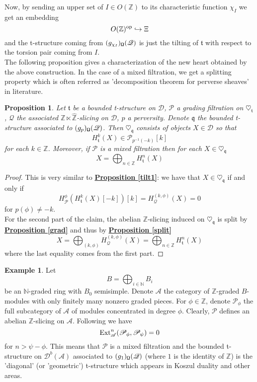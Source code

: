 \documentclass{article}
\newtheorem{prop}[thm]{Proposition}
\theoremstyle{definition}
\newtheorem{exmp}[thm]{Example}
\begin{document}
Now, by sending an upper set of $I \in O(\mathbb{Z})$ to its characteristic function $\chi_I$ we get an embedding $$O(\mathbb{Z})^{\textnormal{op}} \hookrightarrow \Xi$$ and the t-structure coming from $(g_{\chi_I})_{\textnormal{\Libra}}(\mathscr{Q})$ is just the tilting of $\mathfrak{t}$ with respect to the torsion pair coming from $I$. \\
The following proposition gives a characterization of the new heart obtained by the above construction. In the case of a mixed filtration, we get a splitting property which is often referred as 'decomposition theorem for perverse sheaves' in literature. \\

\begin{prop}
Let $\mathfrak{t}$ be a bounded t-structure on $\mathscr{D}$, $\mathscr{P}$ a grading filtration on $\heartsuit_{\mathfrak{t}}$, $\mathscr{Q}$ the associated $\mathbb{Z} \ltimes \hat{\mathbb{Z}}$-slicing on $\mathscr{D}$, $p$ a perversity. Denote $\mathfrak{q}$ the bounded t-structure associated to $(g_p)_{\textnormal{\Libra}}(\mathscr{Q})$. Then $\heartsuit_{\mathfrak{q}}$ consists of objects $X \in \mathscr{D}$ so that $$H_{\mathfrak{t}}^{k}(X) \in \mathscr{P}_{p^{-1}(-k)}[k]$$ 
for each $k \in \mathbb{Z}$. Moreover, if $\mathscr{P}$ is a mixed filtration then for each $X \in \heartsuit_{\mathfrak{q}}$ $$X=\bigoplus_{n \in \mathbb{Z}}H_{\mathfrak{t}}^{n}(X)$$ 
\end{prop}

\begin{proof}
This is very similar to \hyperref[tilt1]{\textbf{Proposition \ref*{tilt1}}}: we have that $X \in \heartsuit_{\mathfrak{q}}$ if and only if $$H_{\mathscr{P}}^{\phi}(H_{\mathfrak{t}}^k(X)[-k])[k]=H_{\mathscr{Q}}^{(k,\phi)}(X)=0$$ 
for $p(\phi) \not = -k$. \\
For the second part of the claim, the abelian $\mathbb{Z}$-slicing induced on $\heartsuit_{\mathfrak{q}}$ is split by \hyperref[grad]{\textbf{Proposition \ref*{grad}}} and thus by \hyperref[split]{\textbf{Proposition \ref*{split}}} $$X=\bigoplus_{(k,\phi)}H_{\mathscr{Q}}^{(k,\phi)}(X)=\bigoplus_{n \in \mathbb{Z}}H_{\mathfrak{t}}^{n}(X)$$
where the last equality comes from the first part. 
\end{proof}

\begin{exmp}
Let $$B=\bigoplus_{i\in \mathbb{N}}B_i$$ be an $\mathbb{N}$-graded ring with $B_0$ semisimple. Denote $\mathscr{A}$ the category of $\mathbb{Z}$-graded $B$-modules with only finitely many nonzero graded pieces. For $\phi \in \mathbb{Z}$, denote $\mathscr{P}_{\phi}$ the full subcategory of $\mathscr{A}$ of modules concentrated in degree $\phi$. Clearly, $\mathscr{P}$ defines an abelian $\mathbb{Z}$-slicing on $\mathscr{A}$. Following \cite{kos} we have $$\textnormal{Ext}_{\mathscr{A}}^n(\mathscr{P}_{\phi},\mathscr{P}_{\psi})=0$$
for $n>\psi - \phi$. This means that $\mathscr{P}$ is a mixed filtration and the bounded t-structure on $\mathscr{D}^b(\mathscr{A})$ associated to $(g_1)_{\textnormal{\Libra}}(\mathscr{Q})$ (where $1$ is the identity of $\mathbb{Z}$) is the 'diagonal' (or 'geometric') t-structure which appears in Koszul duality and other areas. 
\end{exmp}
\end{document}
